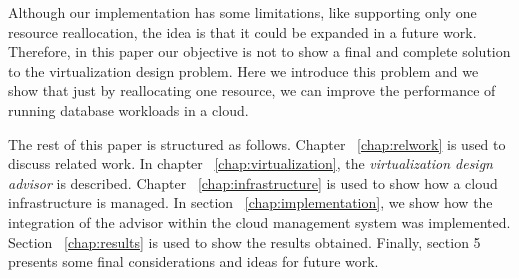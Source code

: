 Although our implementation has some limitations, like supporting only one resource reallocation, the idea is that it could be expanded in a future work. Therefore, in this paper our objective is not to show a final and complete solution to the virtualization design problem. Here we introduce this problem and we show that just by reallocating one resource, we can improve the performance of running database workloads in a cloud. 

The rest of this paper is structured as follows. Chapter ~\ref{chap:relwork} is used to discuss related work. In chapter ~\ref{chap:virtualization}, the \textit{virtualization design advisor} is described. Chapter ~\ref{chap:infrastructure} is used to show how a cloud infrastructure is managed. In section ~\ref{chap:implementation}, we show how the integration of the advisor within the cloud management system was implemented. Section ~\ref{chap:results} is used to show the results obtained. Finally, section 5 presents some final considerations and ideas for future work.

